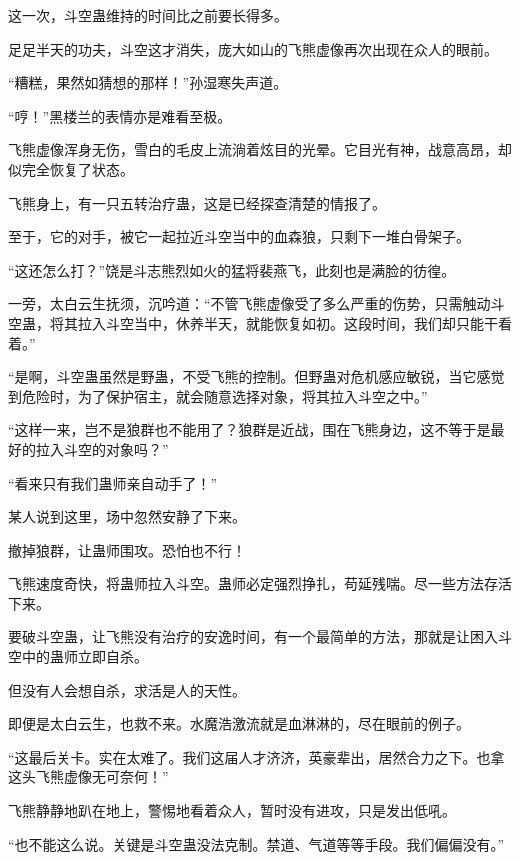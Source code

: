 
\begin{this_body}



这一次，斗空蛊维持的时间比之前要长得多。

足足半天的功夫，斗空这才消失，庞大如山的飞熊虚像再次出现在众人的眼前。

“糟糕，果然如猜想的那样！”孙湿寒失声道。

“哼！”黑楼兰的表情亦是难看至极。

飞熊虚像浑身无伤，雪白的毛皮上流淌着炫目的光晕。它目光有神，战意高昂，却似完全恢复了状态。

飞熊身上，有一只五转治疗蛊，这是已经探查清楚的情报了。

至于，它的对手，被它一起拉近斗空当中的血森狼，只剩下一堆白骨架子。

“这还怎么打？”饶是斗志熊烈如火的猛将裴燕飞，此刻也是满脸的彷徨。

一旁，太白云生抚须，沉吟道：“不管飞熊虚像受了多么严重的伤势，只需触动斗空蛊，将其拉入斗空当中，休养半天，就能恢复如初。这段时间，我们却只能干看着。”

“是啊，斗空蛊虽然是野蛊，不受飞熊的控制。但野蛊对危机感应敏锐，当它感觉到危险时，为了保护宿主，就会随意选择对象，将其拉入斗空之中。”

“这样一来，岂不是狼群也不能用了？狼群是近战，围在飞熊身边，这不等于是最好的拉入斗空的对象吗？”

“看来只有我们蛊师亲自动手了！”

某人说到这里，场中忽然安静了下来。

撤掉狼群，让蛊师围攻。恐怕也不行！

飞熊速度奇快，将蛊师拉入斗空。蛊师必定强烈挣扎，苟延残喘。尽一些方法存活下来。

要破斗空蛊，让飞熊没有治疗的安逸时间，有一个最简单的方法，那就是让困入斗空中的蛊师立即自杀。

但没有人会想自杀，求活是人的天性。

即便是太白云生，也救不来。水魔浩激流就是血淋淋的，尽在眼前的例子。

“这最后关卡。实在太难了。我们这届人才济济，英豪辈出，居然合力之下。也拿这头飞熊虚像无可奈何！”

飞熊静静地趴在地上，警惕地看着众人，暂时没有进攻，只是发出低吼。

“也不能这么说。关键是斗空蛊没法克制。禁道、气道等等手段。我们偏偏没有。”


\end{this_body}
